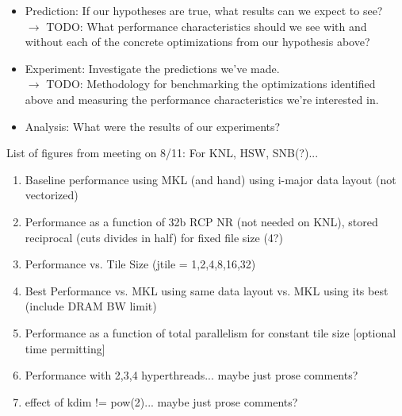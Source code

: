 \documentclass[conference]{IEEEtran}
\begin{document}
\begin{itemize}
\item Prediction: If our hypotheses are true, what results can we expect to
see? \\
$\rightarrow$ TODO: What performance characteristics should we see with and
without each of the concrete optimizations from our hypothesis above?

\item Experiment: Investigate the predictions we've made. \\
$\rightarrow$ TODO: Methodology for benchmarking the optimizations identified
above and measuring the performance characteristics we're interested
in.

\item Analysis: What were the results of our experiments?
\end{itemize}

List of figures from meeting on 8/11:
For KNL, HSW, SNB(?)...
\begin{enumerate}
\item Baseline performance using MKL (and hand) using i-major data layout (not
vectorized)
\item Performance as a function of 32b RCP NR (not needed on KNL), stored
reciprocal (cuts divides in half) for fixed file size (4?)
\item Performance vs. Tile Size (jtile = 1,2,4,8,16,32)
\item Best Performance vs. MKL using same data layout vs. MKL using its best
(include DRAM BW limit)
\item Performance as a function of total parallelism for constant tile size
[optional time permitting]
\item Performance with 2,3,4 hyperthreads...  maybe just prose comments?
\item effect of kdim != pow(2)... maybe just prose comments?
\end{enumerate}

% 

\end{document}
